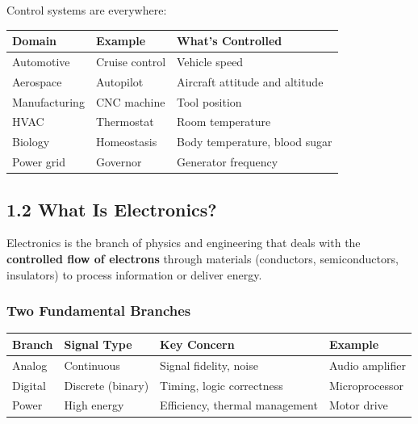 \documentclass[11pt,a4paper]{book}
\begin{document}
Control systems are everywhere:

\begin{center}
\begin{tabular}{|l|l|l|}
\hline
Domain & Example & What's Controlled \\
\hline
Automotive & Cruise control & Vehicle speed \\
Aerospace & Autopilot & Aircraft attitude and altitude \\
Manufacturing & CNC machine & Tool position \\
HVAC & Thermostat & Room temperature \\
Biology & Homeostasis & Body temperature, blood sugar \\
Power grid & Governor & Generator frequency \\
\hline
\end{tabular}
\end{center}

\medskip\noindent\hrulefill\medskip

\subsection{1.2 What Is Electronics?}

Electronics is the branch of physics and engineering that deals with the \textbf{controlled flow of electrons} through materials (conductors, semiconductors, insulators) to process information or deliver energy.

\subsubsection{Two Fundamental Branches}

\begin{center}
\begin{tabular}{|l|l|l|l|}
\hline
Branch & Signal Type & Key Concern & Example \\
\hline
Analog & Continuous & Signal fidelity, noise & Audio amplifier \\
Digital & Discrete (binary) & Timing, logic correctness & Microprocessor \\
Power & High energy & Efficiency, thermal management & Motor drive \\
\hline
\end{tabular}
\end{center}
\end{document}
